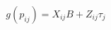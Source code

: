 \documentclass[11pt]{article}
\begin{document}
\begin{equation}
g(p_{ij}) = X_{ij}B  + Z_{ij} \tau_j 
\label{mixed} 
\end{equation}
%
\end{document}
